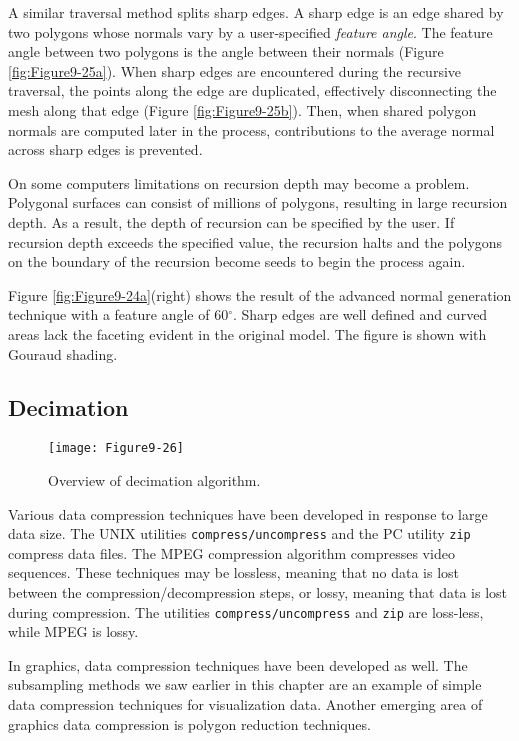 A similar traversal method splits sharp edges. A sharp edge is an edge shared by two polygons whose normals vary by a user-specified \emph{feature angle}. The feature angle between two polygons is the angle between their normals (Figure \ref{fig:Figure9-25a}). When sharp edges are encountered during the recursive traversal, the points along the edge are duplicated, effectively disconnecting the mesh along that edge (Figure \ref{fig:Figure9-25b}). Then, when shared polygon normals are computed later in the process, contributions to the average normal across sharp edges is prevented.

On some computers limitations on recursion depth may become a problem. Polygonal surfaces can consist of millions of polygons, resulting in large recursion depth. As a result, the depth of recursion can be specified by the user. If recursion depth exceeds the specified value, the recursion halts and the polygons on the boundary of the recursion become seeds to begin the process again.

Figure \ref{fig:Figure9-24a}(right) shows the result of the advanced normal generation technique with a feature angle of 60$^\circ$. Sharp edges are well defined and curved areas lack the faceting evident in the original model. The figure is shown with Gouraud shading.

\subsection{Decimation}

\begin{figure}[!htb]
	\centering
	\texttt{[image: Figure9-26]}
	\caption{Overview of decimation algorithm.}
	\label{fig:Figure9-26}
\end{figure}

Various data compression techniques have been developed in response to large data size. The UNIX utilities \texttt{compress/uncompress} and the PC utility \texttt{zip} compress data files. The MPEG compression algorithm compresses video sequences. These techniques may be lossless, meaning that no data is lost between the compression/decompression steps, or lossy, meaning that data is lost during compression. The utilities \texttt{compress/uncompress} and \texttt{zip} are loss-less, while MPEG is lossy.

In graphics, data compression techniques have been developed as well. The subsampling methods we saw earlier in this chapter are an example of simple data compression techniques for visualization data. Another emerging area of graphics data compression is polygon reduction techniques.

